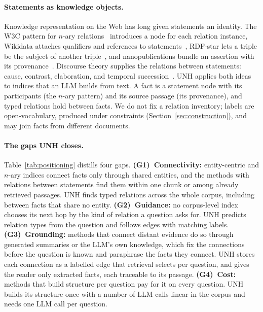 \documentclass[sigconf, review, anonymous]{acmart}
\newcommand{\sys}{UNH}
\begin{document}
\paragraph{Statements as knowledge objects.}
Knowledge representation on the Web has long given statements an identity. The W3C pattern for $n$-ary relations~\cite{noy2006nary} introduces a node for each relation instance, Wikidata attaches qualifiers and references to statements~\cite{vrandecic2014wikidata}, RDF-star lets a triple be the subject of another triple~\cite{hartig2017rdfstar}, and nanopublications bundle an assertion with its provenance~\cite{groth2010nanopub}. Discourse theory supplies the relations between statements: cause, contrast, elaboration, and temporal succession~\cite{mann1988rhetorical,prasad2017penn}. \sys{} applies both ideas to indices that an LLM builds from text. A fact is a statement node with its participants (the $n$-ary pattern) and its source passage (its provenance), and typed relations hold between facts. We do not fix a relation inventory; labels are open-vocabulary, produced under constraints (Section~\ref{sec:construction}), and may join facts from different documents.

\paragraph{The gaps \sys{} closes.}
Table~\ref{tab:positioning} distills four gaps. \textbf{(G1)~Connectivity:} entity-centric and $n$-ary indices connect facts only through shared entities, and the methods with relations between statements find them within one chunk or among already retrieved passages. \sys{} finds typed relations across the whole corpus, including between facts that share no entity. \textbf{(G2)~Guidance:} no corpus-level index chooses its next hop by the kind of relation a question asks for. \sys{} predicts relation types from the question and follows edges with matching labels. \textbf{(G3)~Grounding:} methods that connect distant evidence do so through generated summaries or the LLM's own knowledge, which fix the connections before the question is known and paraphrase the facts they connect. \sys{} stores each connection as a labelled edge that retrieval selects per question, and gives the reader only extracted facts, each traceable to its passage. \textbf{(G4)~Cost:} methods that build structure per question pay for it on every question. \sys{} builds its structure once with a number of LLM calls linear in the corpus and needs one LLM call per question.
\end{document}
